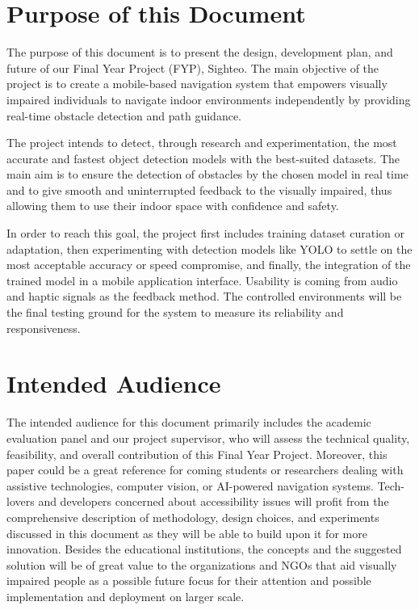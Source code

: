 \documentclass{FastFyp}
\begin{document}
\section{Purpose of this Document}

The purpose of this document is to present the design, development plan, and future of our Final Year Project (FYP), Sighteo. The main objective of the project is to create a mobile-based navigation system that empowers visually impaired individuals to navigate indoor environments independently by providing real-time obstacle detection and path guidance.  

The project intends to detect, through research and experimentation, the most accurate and fastest object detection models with the best-suited datasets. The main aim is to ensure the detection of obstacles by the chosen model in real time and to give smooth and uninterrupted feedback to the visually impaired, thus allowing them to use their indoor space with confidence and safety.

In order to reach this goal, the project first includes training dataset curation or adaptation, then experimenting with detection models like YOLO to settle on the most acceptable accuracy or speed compromise, and finally, the integration of the trained model in a mobile application interface. Usability is coming from audio and haptic signals as the feedback method. The controlled environments will be the final testing ground for the system to measure its reliability and responsiveness.

\section{Intended Audience}
The intended audience for this document primarily includes the academic evaluation panel and our project supervisor, who will assess the technical quality, feasibility, and overall contribution of this Final Year Project. Moreover, this paper could be a great reference for coming students or researchers dealing with assistive technologies, computer vision, or AI-powered navigation systems. Tech-lovers and developers concerned about accessibility issues will profit from the comprehensive description of methodology, design choices, and experiments discussed in this document as they will be able to build upon it for more innovation. Besides the educational institutions, the concepts and the suggested solution will be of great value to the organizations and NGOs that aid visually impaired people as a possible future focus for their attention and possible implementation and deployment on larger scale.
\end{document}
